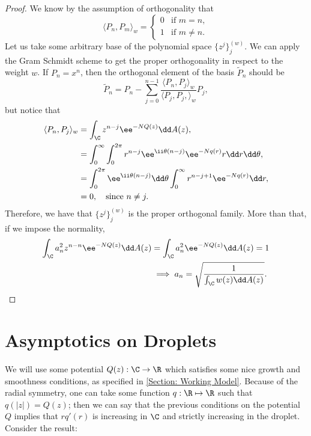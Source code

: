 \begin{proof}
	We know by the assumption of orthogonality that
	\begin{equation}
		\langle P_n, P_m \rangle_w = 
		\begin{cases}
			0 & \text{if $m = n$}, \\
			1 & \text{if $m \neq n$}.
		\end{cases}
	\end{equation} 
	Let us take some arbitrary base of the polynomial space $\{z^j\}_j^{(w)}$. We can apply the Gram Schmidt scheme to get the proper orthogonality in respect to the weight $w$. If $P_n = x^n$, then the orthogonal element of the basis $\tilde{P}_n$ should be
	\begin{equation}
		\tilde{P}_n = P_n - \sum_{j=0}^{n-1} \frac{\langle P_n, P_{j} \rangle_w}{\langle P_{j}, P_{j}, \rangle_w} P_{j},
	\end{equation}
	but notice that
	\begin{align}
		\langle P_n, P_{j} \rangle_w & = \int_{\C} z^{n-j} \ee^{-N Q(z)} \dd A(z), \\
		& = \int_{0}^{\infty} \int_{0}^{2\pi} r^{n-j} \ee^{\ii \theta (n - j)} \ee^{-N q(r)} r \dd r \dd \theta, \\
		& = \int_{0}^{2\pi} \ee^{\ii \theta (n - j)} \dd \theta \int_{0}^{\infty} r^{n-j+1} \ee^{-N q(r)} \dd r, \\
		& = 0, \quad \text{since} \  n \neq j.
	\end{align}
	Therefore, we have that $\{z^j\}_j^{(w)}$ is the proper orthogonal family. More than that, if we impose the normality,
	\begin{align}
		\int_{\C} a_n^2 z^{n-n} \ee^{-N Q(z)} \dd A(z) & = \int_{\C} a_n^2 \ee^{-N Q(z)} \dd A(z) = 1 \\
		& \implies a_n = \sqrt{\frac{1}{\int_{\C} w(z) \dd A(z)}}.
	\end{align}
\end{proof}

\section{Asymptotics on Droplets}

We will use some potential $Q(z) : \C \rightarrow \R$ 
which satisfies some nice growth and smoothness conditions, as specified in \autoref{Section: Working Model}. Because of the radial symmetry, one can take some function $q: \R \mapsto \R$ such that $q(|z|) = Q(z)$; then we can say that the previous conditions on the potential $Q$ implies that $r q'(r)$ is increasing in $\C$ and strictly increasing in the droplet. Consider the result:

